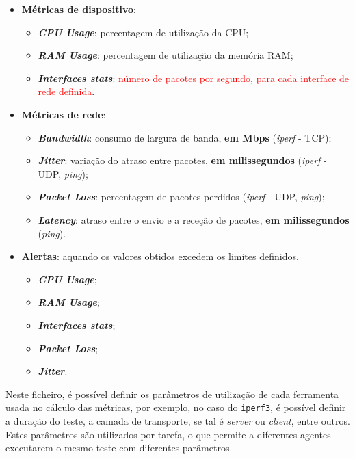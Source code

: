 \documentclass[a4paper,12pt]{scrreprt}
\begin{document}
\begin{itemize}
    \item \textbf{Métricas de dispositivo}:
    \begin{itemize}
        \item \textbf{\textit{CPU Usage}}: percentagem de utilização da CPU;
        \item \textbf{\textit{RAM Usage}}: percentagem de utilização da memória RAM;
        \item \textbf{\textit{Interfaces stats}}: \textcolor{red}{número de pacotes por segundo,
            para cada interface de rede definida}.
    \end{itemize}
    \item \textbf{Métricas de rede}:
    \begin{itemize}
        \item \textbf{\textit{Bandwidth}}: consumo de largura de banda, \textbf{em Mbps} (\textit{iperf} - TCP); 
        \item \textbf{\textit{Jitter}}: variação do atraso entre pacotes, \textbf{em milissegundos}  (\textit{iperf} - UDP, \textit{ping});
        \item \textbf{\textit{Packet Loss}}: percentagem de pacotes perdidos (\textit{iperf} - UDP, \textit{ping}); 
        \item \textbf{\textit{Latency}}: atraso entre o envio e a receção de pacotes, \textbf{em milissegundos} (\textit{ping}). 
    \end{itemize}
    \item \textbf{Alertas}: aquando os valores obtidos excedem os limites definidos.
    \begin{itemize}
        \item \textbf{\textit{CPU Usage}};
        \item \textbf{\textit{RAM Usage}};
        \item \textbf{\textit{Interfaces stats}};
        \item \textbf{\textit{Packet Loss}};
        \item \textbf{\textit{Jitter}}.
    \end{itemize}
\end{itemize}

Neste ficheiro, é possível definir os parâmetros de utilização de cada ferramenta usada no cálculo das métricas,
por exemplo, no caso do \texttt{iperf3}, é possível definir a duração do teste, a camada de transporte, se tal é
\textit{server} ou \textit{client}, entre outros. Estes parâmetros são utilizados por tarefa, o que permite a
diferentes agentes executarem o mesmo teste com diferentes parâmetros.
\end{document}
